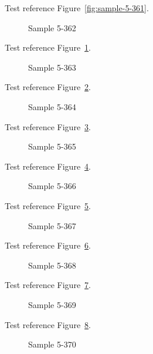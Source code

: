 Test reference Figure~\ref{fig:sample-5-361}.

\begin{figure}[tbhp]
\caption{Sample 5-362}
\label{fig:sample-5-362}
\end{figure}

Test reference Figure~\ref{fig:sample-5-362}.

\begin{figure}[tbhp]
\caption{Sample 5-363}
\label{fig:sample-5-363}
\end{figure}

Test reference Figure~\ref{fig:sample-5-363}.

\begin{figure}[tbhp]
\caption{Sample 5-364}
\label{fig:sample-5-364}
\end{figure}

Test reference Figure~\ref{fig:sample-5-364}.

\begin{figure}[tbhp]
\caption{Sample 5-365}
\label{fig:sample-5-365}
\end{figure}

Test reference Figure~\ref{fig:sample-5-365}.

\begin{figure}[tbhp]
\caption{Sample 5-366}
\label{fig:sample-5-366}
\end{figure}

Test reference Figure~\ref{fig:sample-5-366}.

\begin{figure}[tbhp]
\caption{Sample 5-367}
\label{fig:sample-5-367}
\end{figure}

Test reference Figure~\ref{fig:sample-5-367}.

\begin{figure}[tbhp]
\caption{Sample 5-368}
\label{fig:sample-5-368}
\end{figure}

Test reference Figure~\ref{fig:sample-5-368}.

\begin{figure}[tbhp]
\caption{Sample 5-369}
\label{fig:sample-5-369}
\end{figure}

Test reference Figure~\ref{fig:sample-5-369}.

\begin{figure}[tbhp]
\caption{Sample 5-370}
\label{fig:sample-5-370}
\end{figure}


